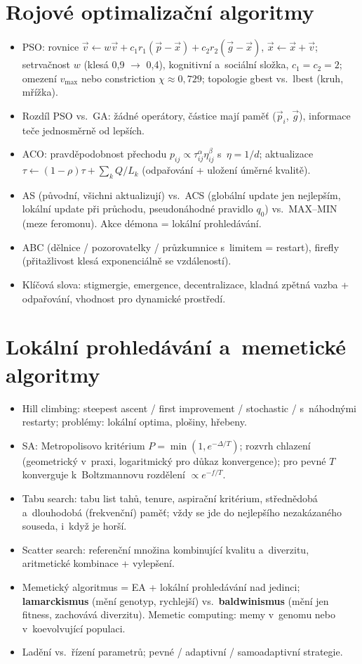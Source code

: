 \documentclass[11pt,a4paper]{article}
\theoremstyle{definition}
\begin{document}
\section{Rojové optimalizační algoritmy}
\begin{itemize}
\item PSO: rovnice
 $\vec v \gets w\vec v + c_1r_1(\vec p - \vec x) + c_2r_2(\vec g - \vec x)$,
 $\vec x \gets \vec x + \vec v$; setrvačnost $w$ (klesá 0{,}9 $\to$ 0{,}4),
 kognitivní a~sociální složka, $c_1=c_2=2$; omezení $v_{\max}$ nebo
 constriction $\chi \approx 0{,}729$; topologie gbest vs.\ lbest (kruh,
 mřížka).
\item Rozdíl PSO vs.\ GA: žádné operátory, částice mají paměť
 ($\vec p_i$, $\vec g$), informace teče jednosměrně od lepších.
\item ACO: pravděpodobnost přechodu
 $p_{ij} \propto \tau_{ij}^{\alpha}\eta_{ij}^{\beta}$ s~$\eta = 1/d$;
 aktualizace $\tau \gets (1-\rho)\tau + \sum_k Q/L_k$ (odpařování + uložení
 úměrné kvalitě).
\item AS (původní, všichni aktualizují) vs.\ ACS (globální update jen
 nejlepším, lokální update při průchodu, pseudonáhodné pravidlo $q_0$)
 vs.\ MAX--MIN (meze feromonu). Akce démona = lokální prohledávání.
\item ABC (dělnice / pozorovatelky / průzkumnice s~limitem = restart),
 firefly (přitažlivost klesá exponenciálně se vzdáleností).
\item Klíčová slova: stigmergie, emergence, decentralizace, kladná zpětná
 vazba + odpařování, vhodnost pro dynamické prostředí.
\end{itemize}

\section{Lokální prohledávání a~memetické algoritmy}
\begin{itemize}
\item Hill climbing: steepest ascent / first improvement / stochastic /
 s~náhodnými restarty; problémy: lokální optima, plošiny, hřebeny.
\item SA: Metropolisovo kritérium $P = \min(1, e^{-\Delta/T})$; rozvrh chlazení
 (geometrický v~praxi, logaritmický pro důkaz konvergence); pro pevné $T$
 konverguje k~Boltzmannovu rozdělení $\propto e^{-f/T}$.
\item Tabu search: tabu list tahů, tenure, aspirační kritérium, střednědobá
 a~dlouhodobá (frekvenční) paměť; vždy se jde do nejlepšího nezakázaného
 souseda, i~když je horší.
\item Scatter search: referenční množina kombinující kvalitu a~diverzitu,
 aritmetické kombinace + vylepšení.
\item Memetický algoritmus = EA + lokální prohledávání nad jedinci;
 \textbf{lamarckismus} (mění genotyp, rychlejší) vs.\ \textbf{baldwinismus}
 (mění jen fitness, zachovává diverzitu). Memetic computing: memy v~genomu
 nebo v~koevolvující populaci.
\item Ladění vs.\ řízení parametrů; pevné / adaptivní / samoadaptivní strategie.
\end{itemize}
\end{document}
